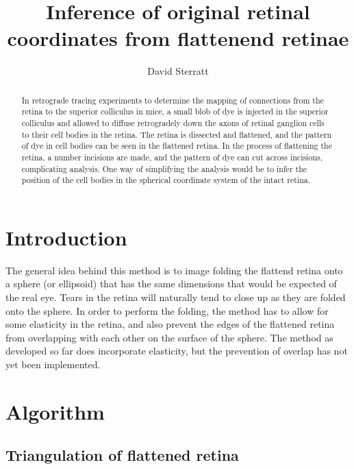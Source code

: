 \documentclass{article}
\title{Inference of original retinal coordinates from  flattenend
  retinae}
\author{David Sterratt}
\begin{document}
\maketitle

\begin{abstract}
  In retrograde tracing experiments to determine the mapping of
  connections from the retina to the superior colliculus in mice, a
  small blob of dye is injected in the superior colliculus and allowed
  to diffuse retrogradely down the axons of retinal ganglion cells to
  their cell bodies in the retina. The retina is dissected and
  flattened, and the pattern of dye in cell bodies can be seen in the
  flattened retina.  In the process of flattening the retina, a number
  incisions are made, and the pattern of dye can cut across incisions,
  complicating analysis.  One way of simplifying the analysis would be
  to infer the position of the cell bodies in the spherical coordinate
  system of the intact retina.  
\end{abstract}

\section{Introduction}
\label{fold-sphere:sec:introduction}

The general idea behind this method is to image folding the flattend
retina onto a sphere (or ellipsoid) that has the same dimensions that
would be expected of the real eye. Tears in the retina will naturally
tend to close up as they are folded onto the sphere.  In order to
perform the folding, the method has to allow for some elasticity in
the retina, and also prevent the edges of the flattened retina from
overlapping with each other on the surface of the sphere. The method
as developed so far does incorporate elasticity, but the prevention of
overlap has not yet been implemented.

\section{Algorithm}
\label{fold-retina:sec:method}

\subsection{Triangulation of flattened retina}
\label{fold-sphere:sec:triang-flatt-retina}

\end{document}
